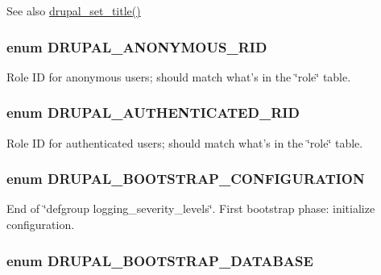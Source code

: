 \begin{DoxySeeAlso}{See also}
\hyperlink{bootstrap_8inc_a1994d49eb621df71fe1306e13b7e4910}{drupal\_\-set\_\-title()} 
\end{DoxySeeAlso}
\hypertarget{bootstrap_8inc_ac7816037c6b6b794a56dcce4dea70569}{
\subsubsection[{DRUPAL\_\-ANONYMOUS\_\-RID}]{\setlength{\rightskip}{0pt plus 5cm}enum {\bf DRUPAL\_\-ANONYMOUS\_\-RID}}}
\label{bootstrap_8inc_ac7816037c6b6b794a56dcce4dea70569}
Role ID for anonymous users; should match what's in the \char`\"{}role\char`\"{} table. \hypertarget{bootstrap_8inc_ac2d2d9cd4c8559510f9baa997525373e}{
\subsubsection[{DRUPAL\_\-AUTHENTICATED\_\-RID}]{\setlength{\rightskip}{0pt plus 5cm}enum {\bf DRUPAL\_\-AUTHENTICATED\_\-RID}}}
\label{bootstrap_8inc_ac2d2d9cd4c8559510f9baa997525373e}
Role ID for authenticated users; should match what's in the \char`\"{}role\char`\"{} table. \hypertarget{bootstrap_8inc_ad71394314c3ad7cef54b5f566e3ec177}{
\subsubsection[{DRUPAL\_\-BOOTSTRAP\_\-CONFIGURATION}]{\setlength{\rightskip}{0pt plus 5cm}enum {\bf DRUPAL\_\-BOOTSTRAP\_\-CONFIGURATION}}}
\label{bootstrap_8inc_ad71394314c3ad7cef54b5f566e3ec177}
End of \char`\"{}defgroup logging\_\-severity\_\-levels\char`\"{}. First bootstrap phase: initialize configuration. \hypertarget{bootstrap_8inc_a693d842eaaf448b1e6c37cc4ef068e3a}{
\subsubsection[{DRUPAL\_\-BOOTSTRAP\_\-DATABASE}]{\setlength{\rightskip}{0pt plus 5cm}enum {\bf DRUPAL\_\-BOOTSTRAP\_\-DATABASE}}}
